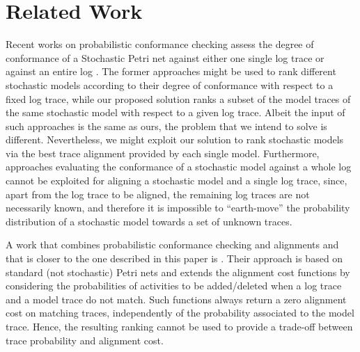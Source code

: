 \section{Related Work}
Recent works on probabilistic conformance checking assess the degree of conformance of a Stochastic Petri net against either one single log trace \cite{DBLP:conf/icpm/PolyvyanyyK19,DBLP:journals/tosem/PolyvyanyySWCM20} or against an entire log \cite{LeemansSA19}. %
The former approaches might be used to rank different stochastic models according to their degree of conformance with respect to a fixed log trace, while our proposed solution ranks a subset of the model traces of the same stochastic model with respect to a given log trace. Albeit the input of such approaches is the same as ours, the problem that we intend to solve is different. Nevertheless, we might exploit our solution to rank stochastic models via the best trace alignment provided by each single model. Furthermore, approaches evaluating the conformance of a stochastic model against a whole log cannot be exploited for aligning a stochastic model and a single log trace, since, apart from the log trace to be aligned, the remaining log traces are not necessarily known, and therefore it is impossible to ``earth-move'' the probability distribution of a stochastic model towards a set of unknown traces.

A work that combines probabilistic conformance checking and alignments and that is closer to the one described in this paper is \cite{AlizadehLZ14a}. Their approach is based on standard (not stochastic) Petri nets and extends the alignment cost functions by considering the probabilities of activities to be added/deleted when a log trace and a model trace do not match. Such functions always return a zero alignment cost on matching traces, independently of the probability associated to the model trace. Hence, the resulting ranking cannot be used to provide a trade-off between trace probability and alignment cost.

